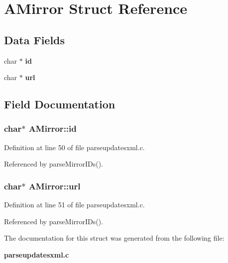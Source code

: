 \section{AMirror Struct Reference}
\label{structAMirror}
\subsection*{Data Fields}
\begin{CompactItemize}
\item 
char $\ast$ {\bf id}
\item 
char $\ast$ {\bf url}
\end{CompactItemize}


\subsection{Field Documentation}
\subsubsection{\setlength{\rightskip}{0pt plus 5cm}char$\ast$ {\bf AMirror::id}}\label{structAMirror_o0}




Definition at line 50 of file parseupdatesxml.c.

Referenced by parse\-Mirror\-IDs().
\subsubsection{\setlength{\rightskip}{0pt plus 5cm}char$\ast$ {\bf AMirror::url}}\label{structAMirror_o1}




Definition at line 51 of file parseupdatesxml.c.

Referenced by parse\-Mirror\-IDs().

The documentation for this struct was generated from the following file:\begin{CompactItemize}
\item 
{\bf parseupdatesxml.c}\end{CompactItemize}
